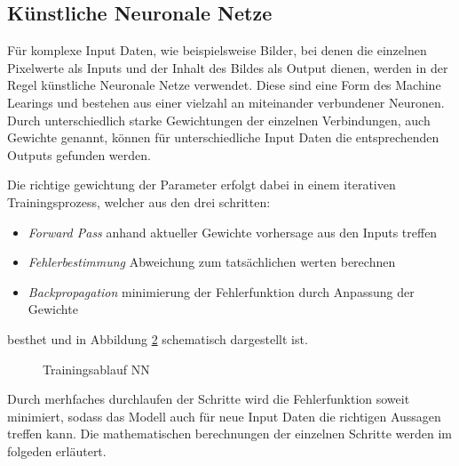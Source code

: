 
\subsection{Künstliche Neuronale Netze} \label{subsec:nn}

Für komplexe Input Daten, wie beispielsweise Bilder, bei denen 
die einzelnen Pixelwerte als Inputs und der Inhalt des Bildes als 
Output dienen, werden in der Regel künstliche Neuronale Netze verwendet.
Diese sind eine Form des Machine Learings und bestehen aus einer 
vielzahl an miteinander verbundener Neuronen. Durch unterschiedlich 
starke Gewichtungen der einzelnen Verbindungen, auch Gewichte genannt, 
können für unterschiedliche Input Daten die entsprechenden Outputs 
gefunden werden.

\begin{figure}[H]
    \centering
    \label{fig:nn}
    \def\svgwidth{0.65\columnwidth}
    \footnotesize
    
\end{figure}

Die richtige gewichtung der Parameter erfolgt dabei in einem iterativen Trainingsprozess, 
welcher aus den drei schritten:


\begin{itemize}
    \item \textit{Forward Pass} anhand aktueller Gewichte vorhersage aus den Inputs treffen
    \item \textit{Fehlerbestimmung} Abweichung zum tatsächlichen werten berechnen
    \item \textit{Backpropagation} minimierung der Fehlerfunktion durch Anpassung der Gewichte
\end{itemize}

besthet und in Abbildung \ref{fig:train} schematisch dargestellt ist.



\begin{figure}[H]
    \centering
    \label{fig:train}
    
    \caption{Trainingsablauf NN}
\end{figure}




Durch merhfaches durchlaufen der Schritte wird die Fehlerfunktion soweit minimiert, 
sodass das Modell auch für neue Input Daten die richtigen Aussagen treffen kann.
Die mathematischen berechnungen der einzelnen Schritte werden im folgeden erläutert.


